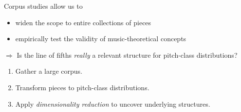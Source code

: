 
\begin{frame}{\insertsectionhead}

  Corpus studies allow us to
  \begin{itemize}
    \item widen the \alert{scope} to entire collections of pieces
    \item empirically \alert{test} the validity of music-theoretical concepts
  \end{itemize}

  \pause

  $\Rightarrow$ Is the line of fifths \emph{really} a \alert{relevant structure} for pitch-class distributions?

  \pause

  \begin{enumerate}
    \item Gather a large corpus.
    \item Transform pieces to pitch-class distributions.
    \item Apply \emph{dimensionality reduction} to uncover underlying structures.
  \end{enumerate}
\end{frame}


